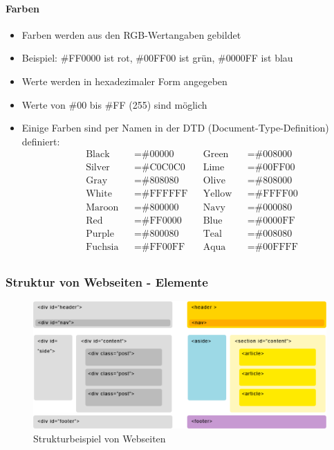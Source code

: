 \documentclass[10pt,a4paper]{article}
\begin{document}
\paragraph{Farben}
\begin{itemize}[noitemsep,topsep=0pt,leftmargin=*]
    \item Farben werden aus den RGB-Wertangaben gebildet
    \item Beispiel: \#FF0000 ist rot, \#00FF00 ist grün, \#0000FF ist blau
    \item Werte werden in hexadezimaler Form angegeben
    \item Werte von \#00 bis \#FF (255) sind möglich
    \item Einige Farben sind per Namen in der DTD (Document-Type-Definition) definiert:
    \begin{align*}
&\text{Black}&      &=\text{\#00000}&   &\text{Green}&   &=\text{\#008000}\\
&\text{Silver}&     &=\text{\#C0C0C0}&  &\text{Lime}&    &=\text{\#00FF00}\\
&\text{Gray}&       &=\text{\#808080}&  &\text{Olive}&   &=\text{\#808000}\\
&\text{White}&      &=\text{\#FFFFFF}&   &\text{Yellow}&  &=\text{\#FFFF00}\\
&\text{Maroon}&     &=\text{\#800000}&   &\text{Navy}&    &=\text{\#000080}\\
&\text{Red}&        &=\text{\#FF0000}&   &\text{Blue}&    &=\text{\#0000FF}\\
&\text{Purple}&     &=\text{\#800080}&   &\text{Teal}&    &=\text{\#008080}\\
&\text{Fuchsia}&    &=\text{\#FF00FF}&   &\text{Aqua}&    &=\text{\#00FFFF}\\
    \end{align*}
\end{itemize}

\subsubsection{Struktur von Webseiten - Elemente}
\begin{figure}[H]
    \begin{center}
    \includegraphics[width=14cm]{images/struktur.png}
    \caption{Strukturbeispiel von Webseiten}
    \label{strukturHTML}
    \end{center}
\end{figure}
\end{document}
